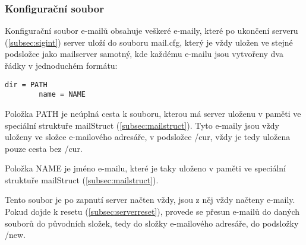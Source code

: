 \documentclass[11pt,a4paper]{report}
\begin{document}
    \subsubsection{Konfigurační soubor}
    \label{subsec:mailconfig}
    Konfigurační soubor e-mailů obsahuje veškeré e-maily, které po ukončení serveru (\ref{subsec:sigint}) server uloží do souboru mail.cfg, který je vždy uložen ve stejné podsložce jako mailserver samotný, kde každému e-mailu jsou vytvořeny dva řádky v jednoduchém formátu:
    \lstset{frameround=fttt}
    \begin{lstlisting}[frame=trBL]
        dir = PATH
        name = NAME
    \end{lstlisting}\par
    Položka PATH je neúplná cesta k souboru, kterou má server uloženu v paměti ve speciální struktuře mailStruct (\ref{subsec:mailstruct}). Tyto e-maily jsou vždy uloženy ve složce e-mailového adresáře, v podsložce /cur, vždy je tedy uložena pouze cesta bez /cur. \par
    Položka NAME je jméno e-mailu, které je taky uloženo v paměti ve speciální struktuře mailStruct (\ref{subsec:mailstruct}).\par
    Tento soubor je po zapnutí server načten vždy, jsou z něj vždy načteny e-maily. Pokud dojde k resetu (\ref{subsec:serverreset}), provede se přesun e-mailů do daných souborů do původních složek, tedy do složky e-mailového adresáře, do podsložky /new.

    \clearpage
\end{document}

